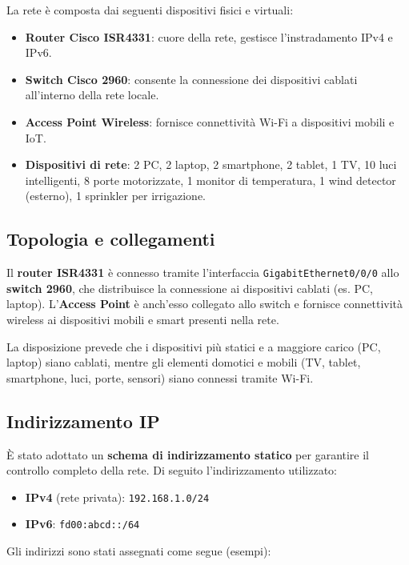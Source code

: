 \documentclass[a4paper,12pt]{article}
\begin{document}
La rete è composta dai seguenti dispositivi fisici e virtuali:

\begin{itemize}
    \item \textbf{Router Cisco ISR4331}: cuore della rete, gestisce l’instradamento IPv4 e IPv6.
    \item \textbf{Switch Cisco 2960}: consente la connessione dei dispositivi cablati all’interno della rete locale.
    \item \textbf{Access Point Wireless}: fornisce connettività Wi-Fi a dispositivi mobili e IoT.
    \item \textbf{Dispositivi di rete}: 2 PC, 2 laptop, 2 smartphone, 2 tablet, 1 TV, 10 luci intelligenti, 8 porte motorizzate, 1 monitor di temperatura, 1 wind detector (esterno), 1 sprinkler per irrigazione.
\end{itemize}

\subsection{Topologia e collegamenti}

Il \textbf{router ISR4331} è connesso tramite l'interfaccia \texttt{GigabitEthernet0/0/0} allo \textbf{switch 2960}, che distribuisce la connessione ai dispositivi cablati (es. PC, laptop). L’\textbf{Access Point} è anch’esso collegato allo switch e fornisce connettività wireless ai dispositivi mobili e smart presenti nella rete.

La disposizione prevede che i dispositivi più statici e a maggiore carico (PC, laptop) siano cablati, mentre gli elementi domotici e mobili (TV, tablet, smartphone, luci, porte, sensori) siano connessi tramite Wi-Fi.

\subsection{Indirizzamento IP}

È stato adottato un \textbf{schema di indirizzamento statico} per garantire il controllo completo della rete. Di seguito l’indirizzamento utilizzato:

\begin{itemize}
    \item \textbf{IPv4} (rete privata): \texttt{192.168.1.0/24}
    \item \textbf{IPv6}: \texttt{fd00:abcd::/64}
\end{itemize}

\noindent Gli indirizzi sono stati assegnati come segue (esempi):
\end{document}
